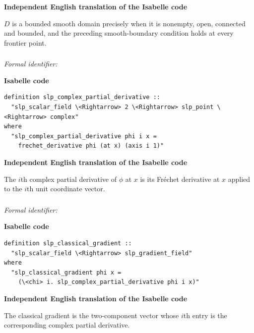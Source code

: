 \documentclass[10pt,oneside]{article}
\newcommand{\reviewlabel}[1]{\par\smallskip\noindent\textsf{\bfseries #1}\par\smallskip}
\begin{document}
\reviewlabel{Independent English translation of the Isabelle code}
$D$ is a bounded smooth domain precisely when it is nonempty, open, connected and bounded, and the preceding smooth-boundary condition holds at every frontier point.

\subsubsection{\texttt{}}
\noindent\textit{Formal identifier:} \texttt{}

\reviewlabel{Isabelle code}
\begin{lstlisting}
definition slp_complex_partial_derivative ::
  "slp_scalar_field \<Rightarrow> 2 \<Rightarrow> slp_point \<Rightarrow> complex"
where
  "slp_complex_partial_derivative phi i x =
    frechet_derivative phi (at x) (axis i 1)"
\end{lstlisting}

\reviewlabel{Independent English translation of the Isabelle code}
The $i$th complex partial derivative of $\phi$ at $x$ is its Fréchet derivative at $x$ applied to the $i$th unit coordinate vector.

\subsubsection{\texttt{}}
\noindent\textit{Formal identifier:} \texttt{}

\reviewlabel{Isabelle code}
\begin{lstlisting}
definition slp_classical_gradient ::
  "slp_scalar_field \<Rightarrow> slp_gradient_field"
where
  "slp_classical_gradient phi x =
    (\<chi> i. slp_complex_partial_derivative phi i x)"
\end{lstlisting}

\reviewlabel{Independent English translation of the Isabelle code}
The classical gradient is the two-component vector whose $i$th entry is the corresponding complex partial derivative.
\end{document}

